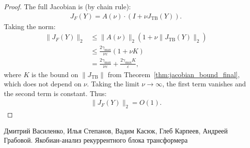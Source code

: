 \documentclass{zapiski}
\theoremstyle{plain}
\theoremstyle{definition}
\theoremstyle{remark}
\DeclareMathOperator{\TB}{TB}
\begin{document}
\begin{proof}
The full Jacobian is (by chain rule):
\begin{align}
J_F(Y) = A(\nu) \cdot (I + \nu J_{\TB}(Y)).
\end{align}
Taking the norm:
\begin{align}
\|J_F(Y)\|_2 
&\le \|A(\nu)\|_2 (1 + \nu \|J_{\TB}(Y)\|_2) \\
&\le \frac{2\gamma_{\max}}{\nu \varepsilon} (1 + \nu K) \\
&= \frac{2\gamma_{\max}}{\nu \varepsilon} + \frac{2\gamma_{\max} K}{\varepsilon},
\end{align}
where $K$ is the bound on $\|J_{\TB}\|$ from Theorem~\ref{thm:jacobian_bound_final}, which does not depend on $\nu$.
Taking the limit $\nu \to \infty$, the first term vanishes and the second term is constant. Thus:
\begin{align}
\|J_F(Y)\|_2 = O(1).
\end{align}
\end{proof}

\newpage

Дмитрий Василенко, Илья Степанов, Вадим Касюк, Глеб Карпеев, Андреей Грабовой. Якобиан-анализ рекуррентного блока трансформера

\begin{abstract}
Рекуррентные трансформеры представляют собой эффективный подход к моделированию глубоких вычислений, однако их использование в итерационных сценариях требует стабильной динамики. В работе исследуется динамика якобиана полного блока трансформера, включающего многоголовое внимание (MSA), сети прямого распространения (FFN) и RMS-нормализацию. Выведена верхняя граница спектральной нормы якобиана и показана роль RMS-нормализации в предотвращении взрыва градиентов.
\end{abstract}

\end{document}
